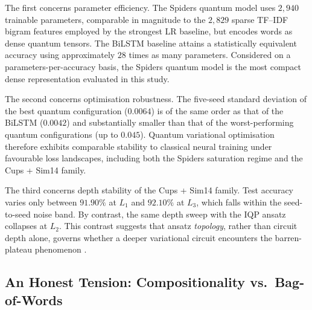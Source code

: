 \documentclass[runningheads]{llncs}
\begin{document}
The first concerns parameter efficiency. The Spiders quantum model uses
\(2{,}940\) trainable parameters, comparable in magnitude to the
\(2{,}829\) sparse TF--IDF bigram features employed by the strongest LR
baseline, but encodes words as dense quantum tensors. The BiLSTM
baseline attains a statistically equivalent accuracy using approximately
\(28\) times as many parameters. Considered on a parameters-per-accuracy
basis, the Spiders quantum model is the most compact dense
representation evaluated in this study.

The second concerns optimisation robustness. The five-seed standard
deviation of the best quantum configuration (\(0.0064\)) is of the same
order as that of the BiLSTM (\(0.0042\)) and substantially smaller than
that of the worst-performing quantum configurations (up to \(0.045\)).
Quantum variational optimisation therefore exhibits comparable stability
to classical neural training under favourable loss landscapes,
including both the Spiders saturation regime and the Cups + Sim14
family.

The third concerns depth stability of the Cups + Sim14 family. Test
accuracy varies only between \(91.90\%\) at \(L_1\) and \(92.10\%\) at
\(L_3\), which falls within the seed-to-seed noise band. By contrast,
the same depth sweep with the IQP ansatz collapses at \(L_2\). This
contrast suggests that ansatz \emph{topology}, rather than circuit
depth alone, governs whether a deeper variational circuit encounters
the barren-plateau phenomenon \cite{mcclean2018}.

\subsection{An Honest Tension: Compositionality vs.\ Bag-of-Words}
\end{document}
